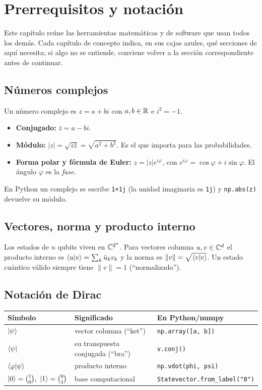 \def\tituloconcepto{Prerrequisitos y notación}


\section{Prerrequisitos y notación}
\label{sec:prerreq}

Este capítulo reúne las herramientas matemáticas y de software que usan todos
los demás. Cada capítulo de concepto indica, en sus cajas azules, qué
secciones de aquí necesita; si algo no se entiende, conviene volver a la
sección correspondiente antes de continuar.

\subsection{Números complejos}
Un número complejo es $z=a+bi$ con $a,b\in\mathbb{R}$ e $i^2=-1$.
\begin{itemize}
  \item \textbf{Conjugado:} $\bar z=a-bi$.
  \item \textbf{Módulo:} $|z|=\sqrt{z\bar z}=\sqrt{a^2+b^2}$. Es el que importa
    para las probabilidades.
  \item \textbf{Forma polar y fórmula de Euler:} $z=|z|e^{i\varphi}$, con
    $e^{i\varphi}=\cos\varphi+i\sin\varphi$. El ángulo $\varphi$ es la
    \emph{fase}.
\end{itemize}
En Python un complejo se escribe \texttt{1+1j} (la unidad imaginaria es
\texttt{1j}) y \texttt{np.abs(z)} devuelve su módulo.

\subsection{Vectores, norma y producto interno}
Los estados de $n$ qubits viven en $\mathbb{C}^{2^n}$. Para vectores columna
$u,v\in\mathbb{C}^d$ el producto interno es $\left\langle u\middle|v\right\rangle=\sum_k \bar u_k v_k$ y la
norma es $\|v\|=\sqrt{\left\langle v\middle|v\right\rangle}$. Un estado cuántico válido siempre tiene
$\|v\|=1$ (``normalizado'').

\subsection{Notación de Dirac}
\begin{center}
\begin{tabular}{@{}lll@{}}
\toprule
Símbolo & Significado & En Python/numpy\\
\midrule
$\left|\psi\right\rangle$ & vector columna (``ket'') & \texttt{np.array([a, b])}\\
$\left\langle\psi\right|$ & su transpuesta conjugada (``bra'') & \texttt{v.conj()}\\
$\left\langle\varphi\middle|\psi\right\rangle$ & producto interno & \texttt{np.vdot(phi, psi)}\\
$\left|0\right\rangle=\binom10,\ \left|1\right\rangle=\binom01$ & base computacional &
  \texttt{Statevector.from\_label("0")}\\
\bottomrule
\end{tabular}
\end{center}

